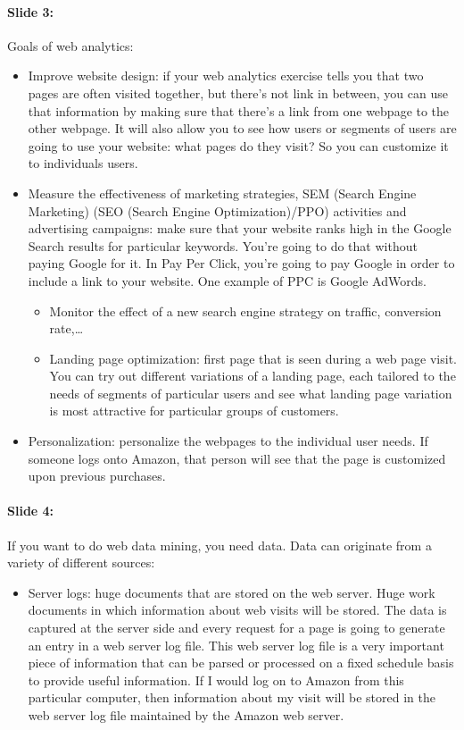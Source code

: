 \documentclass[10pt,a4paper]{report}
\begin{document}
\paragraph{Slide 3:}Goals of web analytics:
\begin{itemize}
\item Improve website design: if your web analytics exercise tells you that two pages are often visited together, but there's not link in between, you can use that information by making sure that there's a link from one webpage to the other webpage. It will also allow you to see how users or segments of users are going to use your website: what pages do they visit? So you can customize it to individuals users.
\item Measure the effectiveness of marketing strategies, SEM (Search Engine Marketing) (SEO (Search Engine Optimization)/PPO) activities and advertising campaigns: make sure that your website ranks high in the Google Search results for particular keywords. You're going to do that without paying Google for it. In Pay Per Click, you're going to pay Google in order to include a link to your website. One example of PPC is Google AdWords. 
\begin{itemize}
\item Monitor the effect of a new search engine strategy on traffic, conversion rate,…
\item Landing page optimization: first page that is seen during a web page visit. You can try out different variations of a landing page, each tailored to the needs of segments of particular users and see what landing page variation is most attractive for particular groups of customers.
\end{itemize}
\item Personalization: personalize the webpages to the individual user needs. If someone logs onto Amazon, that person will see that the page is customized upon previous purchases.
\end{itemize}

\paragraph{Slide 4:}If you want to do web data mining, you need data. Data can originate from a variety of different sources:
\begin{itemize}
\item Server logs: huge documents that are stored on the web server. Huge work documents in which information about web visits will be stored. The data is captured at the server side and every request for a page is going to generate an entry in a web server log file. This web server log file is a very important piece of information that can be parsed or processed on a fixed schedule basis to provide useful information. If I would log on to Amazon from this particular computer, then information about my visit will be stored in the web server log file maintained by the Amazon web server.
\end{itemize}
\end{document}
